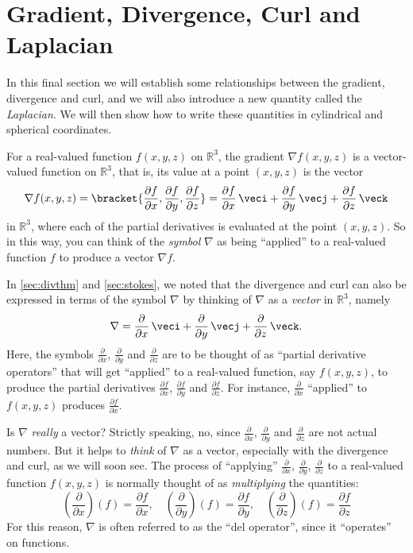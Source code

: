 \section{Gradient, Divergence, Curl and Laplacian}\label{divgradcurllap}

In this final section we will establish some relationships between the gradient, divergence and curl, and we will also introduce a new quantity called the \emph{Laplacian}. We will then show how to write these quantities in cylindrical and spherical coordinates.

For a real-valued function $f(x,y,z)$ on $\mathbb{R}^{3}$, the gradient $\nabla f(x,y,z)$ is a vector-valued function on $\mathbb{R}^{3}$, that is, its value at a point $(x,y,z)$ is the vector
\[
 \nabla f(x,y,z) = \bracket{\frac{\partial f}{\partial x},\frac{\partial f}{\partial y},\frac{\partial f}{\partial z}}
 =\frac{\partial f}{\partial x}\,\veci + \frac{\partial f}{\partial y}\,\vecj +
 \frac{\partial f}{\partial z}\,\veck
\]
in $\mathbb{R}^{3}$, where each of the partial derivatives is evaluated at the point $(x,y,z)$. So in this way, you can think of the \emph{symbol} $\nabla$ as being ``applied'' to a real-valued function $f$ to produce a vector $\nabla f$.

In \autoref{sec:divthm} and \autoref{sec:stokes}, we noted that the divergence and curl can also be expressed in terms of the symbol $\nabla$ by thinking of $\nabla$ as a \emph{vector} in $\mathbb{R}^3$, namely\index{$\nabla$}
\begin{equation}\label{nabladef}
 \nabla = \frac{\partial}{\partial x}\,\veci + \frac{\partial}{\partial y}\,\vecj +
   \frac{\partial}{\partial z}\,\veck .
\end{equation}
Here, the symbols $\frac{\partial}{\partial x}$, $ \frac{\partial}{\partial y}$ and $\frac{\partial}{\partial z}$ are to be thought of as ``partial derivative operators'' that will get ``applied'' to a real-valued function, say $f(x,y,z)$, to produce the partial derivatives $\frac{\partial f}{\partial x}$, $\frac{\partial f}{\partial y}$ and $\frac{\partial f}{\partial z}$. For instance, $\frac{\partial}{\partial x}$ ``applied'' to $f(x,y,z)$ produces $\frac{\partial f}{\partial x}$.

Is $\nabla$ \emph{really} a vector? Strictly speaking, no, since $\frac{\partial}{\partial x}$, $\frac{\partial}{\partial y}$ and $\frac{\partial}{\partial z}$ are not actual numbers. But it helps to \emph{think} of $\nabla$ as a vector, especially with the divergence and curl, as we will soon see. The process of ``applying'' $\frac{\partial}{\partial x}$, $\frac{\partial}{\partial y}$, $\frac{\partial}{\partial z}$ to a real-valued function $f(x,y,z)$ is normally thought of as \emph{multiplying} the quantities:
\[
 \left( \frac{\partial}{\partial x} \right) (f) = \frac{\partial f}{\partial x} ,\quad
 \left( \frac{\partial}{\partial y} \right) (f) = \frac{\partial f}{\partial y} ,\quad
 \left( \frac{\partial}{\partial z} \right) (f) = \frac{\partial f}{\partial z}
\]
For this reason, $\nabla$ is often referred to as the ``del operator'', since it ``operates'' on functions.
 
